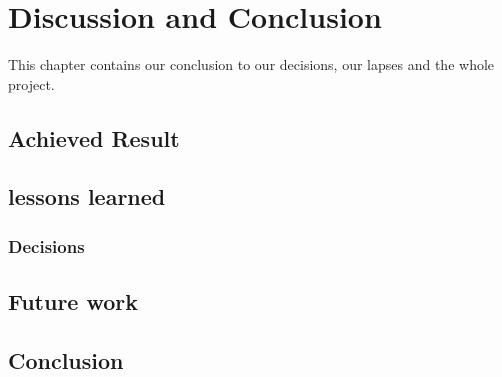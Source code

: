 \chapter{Discussion and Conclusion}
\label{sec:discussion-and-conclusion}

This chapter contains our conclusion to our decisions, our lapses and the whole project.

\section{Achieved Result}

\section{lessons learned}

\subsection{Decisions}

\section{Future work}

\section{Conclusion}

